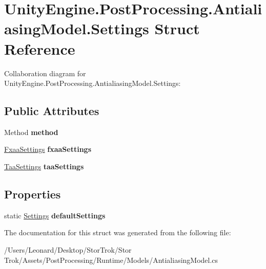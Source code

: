 \hypertarget{struct_unity_engine_1_1_post_processing_1_1_antialiasing_model_1_1_settings}{}\section{Unity\+Engine.\+Post\+Processing.\+Antialiasing\+Model.\+Settings Struct Reference}
\label{struct_unity_engine_1_1_post_processing_1_1_antialiasing_model_1_1_settings}


Collaboration diagram for Unity\+Engine.\+Post\+Processing.\+Antialiasing\+Model.\+Settings\+:
\subsection*{Public Attributes}
\begin{DoxyCompactItemize}
\item 
\mbox{\label{struct_unity_engine_1_1_post_processing_1_1_antialiasing_model_1_1_settings_a290930e87c63130ce62f3329d892ef30}} 
Method {\bfseries method}
\item 
\mbox{\label{struct_unity_engine_1_1_post_processing_1_1_antialiasing_model_1_1_settings_ae69900a58d52b60e6bd31feb3cccb3e5}} 
\hyperlink{struct_unity_engine_1_1_post_processing_1_1_antialiasing_model_1_1_fxaa_settings}{Fxaa\+Settings} {\bfseries fxaa\+Settings}
\item 
\mbox{\label{struct_unity_engine_1_1_post_processing_1_1_antialiasing_model_1_1_settings_aa4ac4787db6aca3c7a806212e9f88e68}} 
\hyperlink{struct_unity_engine_1_1_post_processing_1_1_antialiasing_model_1_1_taa_settings}{Taa\+Settings} {\bfseries taa\+Settings}
\end{DoxyCompactItemize}
\subsection*{Properties}
\begin{DoxyCompactItemize}
\item 
\mbox{\label{struct_unity_engine_1_1_post_processing_1_1_antialiasing_model_1_1_settings_a4a4c39cef618cb3485000208fe831295}} 
static \hyperlink{struct_unity_engine_1_1_post_processing_1_1_antialiasing_model_1_1_settings}{Settings} {\bfseries default\+Settings}
\end{DoxyCompactItemize}


The documentation for this struct was generated from the following file\+:\begin{DoxyCompactItemize}
\item 
/\+Users/\+Leonard/\+Desktop/\+Stor\+Trok/\+Stor Trok/\+Assets/\+Post\+Processing/\+Runtime/\+Models/Antialiasing\+Model.\+cs\end{DoxyCompactItemize}
